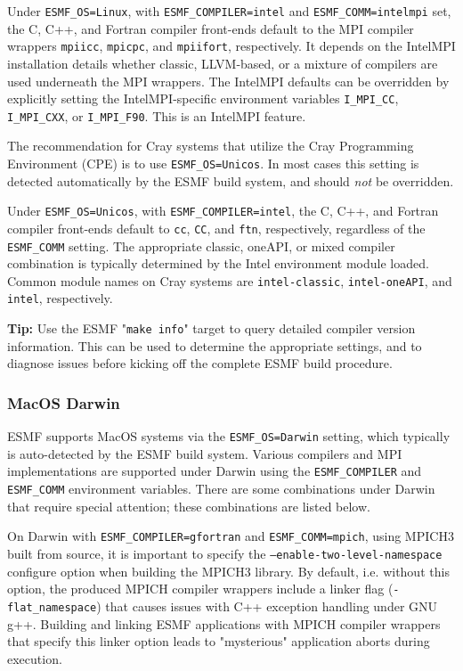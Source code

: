 Under {\tt ESMF\_OS=Linux}, with {\tt ESMF\_COMPILER=intel} and {\tt ESMF\_COMM=intelmpi} set, the C, C++, and Fortran compiler front-ends default to the MPI compiler wrappers {\tt mpiicc}, {\tt mpicpc}, and {\tt mpiifort}, respectively. It depends on the IntelMPI installation details whether classic, LLVM-based, or a mixture of compilers are used underneath the MPI wrappers. The IntelMPI defaults can be overridden by explicitly setting the IntelMPI-specific environment variables {\tt I\_MPI\_CC}, {\tt I\_MPI\_CXX}, or {\tt I\_MPI\_F90}. This is an IntelMPI feature.

The recommendation for Cray systems that utilize the Cray Programming Environment (CPE) is to use {\tt ESMF\_OS=Unicos}. In most cases this setting is detected automatically by the ESMF build system, and should {\em not} be overridden.

Under {\tt ESMF\_OS=Unicos}, with {\tt ESMF\_COMPILER=intel}, the C, C++, and Fortran compiler front-ends default to {\tt cc}, {\tt CC}, and {\tt ftn}, respectively, regardless of the  {\tt ESMF\_COMM} setting. The appropriate classic, oneAPI, or mixed compiler combination is typically determined by the Intel environment module loaded. Common module names on Cray systems are {\tt intel-classic}, {\tt intel-oneAPI}, and {\tt intel}, respectively.

{\bf Tip: } Use the ESMF "{\tt make info}" target to query detailed compiler version information. This can be used to determine the appropriate settings, and to diagnose issues before kicking off the complete ESMF build procedure.

\subsubsection{MacOS Darwin}

ESMF supports MacOS systems via the {\tt ESMF\_OS=Darwin} setting, which
typically is auto-detected by the ESMF build system. Various compilers and
MPI implementations are supported under Darwin using the {\tt ESMF\_COMPILER}
and {\tt ESMF\_COMM} environment variables. There are some combinations under
Darwin that require special attention; these combinations are listed below.

On Darwin with {\tt ESMF\_COMPILER=gfortran} and {\tt ESMF\_COMM=mpich},
using MPICH3 built from source, it is important to specify the
{\tt --enable-two-level-namespace} configure option when building the MPICH3
library. By default, i.e. without this option, the produced MPICH compiler
wrappers include a linker flag ({\tt -flat\_namespace}) that causes issues with
C++ exception handling under GNU g++. Building and linking ESMF applications
with MPICH compiler wrappers that specify this linker option leads to
"mysterious" application aborts during execution.

